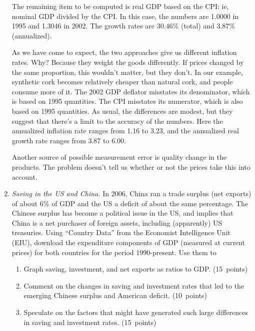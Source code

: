 \documentclass[letterpaper,12pt]{article}
\begin{document}
\begin{enumerate}
The remaining item to be computed is real GDP based on the
CPI: ie, nominal GDP divided by the CPI.  In this case,
the numbers are 1.0000 in 1995 and 1.3046 in 2002.  The growth
rates are 30.46\% (total) and 3.87\% (annualized).

As we have come to expect, the two approaches give us different
inflation rates.  Why?  Because they weight the goods differently.
If prices changed by the same proportion, this wouldn't matter,
but they don't.  In our example, synthetic cork becomes relatively
cheaper than natural cork, and people consume more of it.  The
2002 GDP deflator misstates its denominator, which is based on
1995 quantities.  The CPI misstates its numerator, which is
also based on 1995 quantities. As usual, the differences are
modest, but they suggest that there's a limit to the accuracy of
the numbers.  Here the annualized inflation rate ranges from 1.16
to 3.23, and the annualized real growth rate ranges from 3.87 to
6.00.

Another source of possible measurement error is quality change in
the products.  The problem doesn't tell us whether or not the
prices  take this into account.



\item {\it Saving in the US and China.}  
In 2006, China ran a trade surplus (net exports) of about 6\% of GDP
and the US a deficit of about the same percentage.  
The Chinese surplus has become a political issue in the US, 
and implies that China is a net purchaser of foreign assets, 
including (apparently) US treasuries.  
Using ``Country Data'' from the Economist Intelligence Unit (EIU), 
download the expenditure components of GDP (measured at current prices) 
for both countries for the period 1990-present.  Use them to
\begin{enumerate}
\item Graph saving, investment, and net exports as ratios to GDP.  
(15~points) 
\item Comment on the changes in saving and investment rates 
that led to the emerging Chinese surplus and American deficit.  
(10~points) 
\item Speculate on the factors that might have generated  such large differences in saving and investment rates.  (15~points) 
\end{enumerate}





\end{enumerate}
\end{document}
